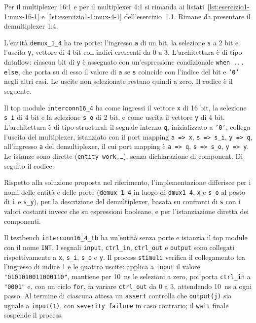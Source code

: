 \implementazione

Per il multiplexer 16:1 e per il multiplexer 4:1 si rimanda ai listati~\ref{lst:esercizio1-1:mux-16-1} e~\ref{lst:esercizio1-1:mux-4-1} dell'esercizio~1.1. Rimane da presentare il demultiplexer 1:4.

L'entità \texttt{demux\_1\_4} ha tre porte: l'ingresso \texttt{a} di un bit, la selezione \texttt{s} a 2 bit e l'uscita \texttt{y}, vettore di 4 bit con indici crescenti da 0 a 3. L'architettura è di tipo dataflow: ciascun bit di \texttt{y} è assegnato con un'espressione condizionale \texttt{when ... else}, che porta su di esso il valore di \texttt{a} se \texttt{s} coincide con l'indice del bit e \texttt{'0'} negli altri casi. Le uscite non selezionate restano quindi a zero. Il codice è il seguente.


Il top module \texttt{interconn16\_4} ha come ingressi il vettore \texttt{x} di 16 bit, la selezione \texttt{s\_i} di 4 bit e la selezione \texttt{s\_o} di 2 bit, e come uscita il vettore \texttt{y} di 4 bit. L'architettura è di tipo structural: il segnale interno \texttt{q}, inizializzato a \texttt{'0'}, collega l'uscita del multiplexer, istanziato con il port mapping \texttt{a => x}, \texttt{s => s\_i}, \texttt{y => q}, all'ingresso \texttt{a} del demultiplexer, il cui port mapping è \texttt{a => q}, \texttt{s => s\_o}, \texttt{y => y}. Le istanze sono dirette (\texttt{entity work.\dots}), senza dichiarazione di component. Di seguito il codice.


Rispetto alla soluzione proposta nel riferimento, l'implementazione differisce per i nomi delle entità e delle porte (\texttt{demux\_1\_4} in luogo di \texttt{dmux1\_4}, \texttt{x} e \texttt{s\_o} al posto di \texttt{i} e \texttt{s\_y}), per la descrizione del demultiplexer, basata su confronti di \texttt{s} con i valori costanti invece che su espressioni booleane, e per l'istanziazione diretta dei componenti.

\simulazione

Il testbench \texttt{interconn16\_4\_tb} ha un'entità senza porte e istanzia il top module con il nome \texttt{INT}. I segnali \texttt{input}, \texttt{ctrl\_in}, \texttt{ctrl\_out} e \texttt{output} sono collegati rispettivamente a \texttt{x}, \texttt{s\_i}, \texttt{s\_o} e \texttt{y}. Il process \texttt{stimuli} verifica il collegamento tra l'ingresso di indice 1 e le quattro uscite: applica a \texttt{input} il valore \texttt{"0101010011000110"}, mantiene per \SI{10}{ns} le selezioni a zero, poi porta \texttt{ctrl\_in} a \texttt{"0001"} e, con un ciclo \texttt{for}, fa variare \texttt{ctrl\_out} da 0 a 3, attendendo \SI{10}{ns} a ogni passo. Al termine di ciascuna attesa un \texttt{assert} controlla che \texttt{output(j)} sia uguale a \texttt{input(1)}, con \texttt{severity failure} in caso contrario; il \texttt{wait} finale sospende il process.

